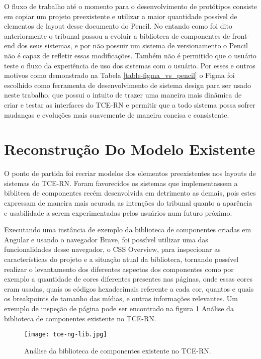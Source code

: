   O fluxo de trabalho até o momento para o desenvolvimento de protótipos consiste em copiar um projeto preexistente e utilizar a maior quantidade possível de elementos de layout desse documento do Pencil. No entando como foi dito anteriormente o tribunal passou a evoluir a biblioteca de componentes de front-end dos seus sistemas, e por não possuir um sistema de versionamento o Pencil não é capaz de refletir essas modificações. Também não é permitido que o usuário teste o fluxo da experiência de uso dos sistemas com o usuário. Por esses e outros motivos como demonstrado na Tabela \ref{table-figma_vs_pencil} o Figma foi escolhido como ferramenta de desenvolvimento de sistema design para ser usado neste trabalho, que possui o intuito de trazer uma maneira mais dinâmica de criar e testar as interfaces do TCE-RN e permitir que a todo sistema possa sofrer mudanças e evoluções mais suavemente de maneira concisa e consistente.

\section{Reconstrução Do Modelo Existente} \label{secao32}

  O ponto de partida foi recriar modelos dos elementos preexistentes nos layouts de sistemas do TCE-RN. Foram favorecidos os sistemas que implementassem a bibliteca de componentes recém desenvolvida em detrimento as demais, pois estes expressam de maneira mais acurada as intenções do tribunal quanto a aparência e usabilidade a serem experimentadas pelos usuários num futuro próximo.

  Executando uma instância de exemplo da biblioteca de componentes criadas em Angular e usando o navegador Brave, foi possível utilizar uma das funcionalidades desse navegador, o CSS Overview, para inspecionar as características do projeto e a situação atual da biblioteca, tornando possível realizar o levantamento dos diferentes aspectos dos componentes como por exemplo a quantidade de cores diferentes presentes nas páginas, onde essas cores eram usadas, quais os códigos hexadecimais referente a cada cor, quantos e quais os breakpoints de tamanho das mídias, e outras informações relevantes. Um exemplo de inspeção de página pode ser encontrado na figura \ref{fig:tcenglib} Análise da biblioteca de componentes existente no TCE-RN.

  \begin{figure}[!h]
    \texttt{[image: tce-ng-lib.jpg]}
    \caption{Análise da biblioteca de componentes existente no TCE-RN.}
    \label{fig:tcenglib}
  \end{figure}

